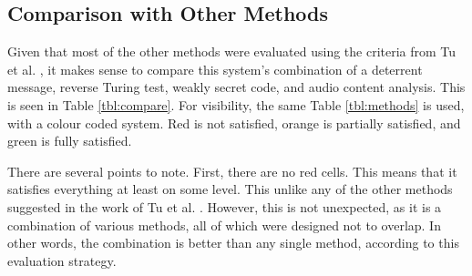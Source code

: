 \documentclass[main.tex]{subfiles}
\begin{document}
\subsection{Comparison with Other Methods}
Given that most of the other methods were evaluated using the criteria from Tu et al. \cite{cisco}, it makes sense to compare this system's combination of a deterrent message, reverse Turing test, weakly secret code, and audio content analysis. This is seen in Table \ref{tbl:compare}. For visibility, the same Table \ref{tbl:methods} is used, with a colour coded system. Red is not satisfied, orange is partially satisfied, and green is fully satisfied.

\begin{table}[htb]
	\centering
	\caption{The different evaluation methods used by Tu et al. \cite{cisco} applied to this system.}
	\label{tbl:compare}
\end{table}

There are several points to note. First, there are no red cells. This means that it satisfies everything at least on some level. This unlike any of the other methods suggested in the work of Tu et al. \cite{cisco}. However, this is not unexpected, as it is a combination of various methods, all of which were designed not to overlap. In other words, the combination is better than any single method, according to this evaluation strategy.
\end{document}
